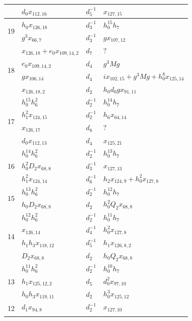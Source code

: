 \documentclass{amsart}
\numberwithin{equation}{section}
\begin{document}
\begin{table}
{\begin{tabular}{|c|l|l|l|}
 & $d_0x_{112,16}$ & $d_{5}^{-1}$ & $x_{127,15}$ \\\hline\hline
\multirow{2}{*}{19} & $h_0x_{126,18}$ & $d_{3}^{-1}$ & $h_0^{15}h_7$ \\\cline{2-4}
 & $g^3x_{66,7}$ & $d_{3}^{-1}$ & $gx_{107,12}$ \\\hline\hline
\multirow{4}{*}{18} & $x_{126,18}+e_0x_{109,14,2}$ & $d_{7}$ & $?$ \\\cline{2-4}
 & $e_0x_{109,14,2}$ & $d_{4}$ & $g^3Mg$ \\\cline{2-4}
 & $gx_{106,14}$ & $d_{4}$ & $ix_{102,15}+g^3Mg+h_0^8x_{125,14}$ \\\cline{2-4}
 & $x_{126,18,2}$ & $d_{2}$ & $h_0d_0gx_{91,11}$ \\\hline\hline
\multirow{4}{*}{17} & $h_0^{15}h_6^2$ & $d_{2}^{-1}$ & $h_0^{14}h_7$ \\\cline{2-4}
 & $h_1^2x_{124,15}$ & $d_{2}^{-1}$ & $h_6x_{64,14}$ \\\cline{2-4}
 & $x_{126,17}$ & $d_{8}$ & $?$ \\\cline{2-4}
 & $d_0x_{112,13}$ & $d_{4}$ & $x_{125,21}$ \\\hline\hline
\multirow{3}{*}{16} & $h_0^{14}h_6^2$ & $d_{2}^{-1}$ & $h_0^{13}h_7$ \\\cline{2-4}
 & $h_0^2D_2x_{68,8}$ & $d_{3}^{-1}$ & $x_{127,13}$ \\\cline{2-4}
 & $h_1^2x_{124,14}$ & $d_{6}^{-1}$ & $h_2x_{124,9}+h_0^2x_{127,8}$ \\\hline\hline
\multirow{2}{*}{15} & $h_0^{13}h_6^2$ & $d_{2}^{-1}$ & $h_0^{12}h_7$ \\\cline{2-4}
 & $h_0D_2x_{68,8}$ & $d_{2}$ & $h_0^2Q_2x_{68,8}$ \\\hline\hline
\multirow{4}{*}{14} & $h_0^{12}h_6^2$ & $d_{2}^{-1}$ & $h_0^{11}h_7$ \\\cline{2-4}
 & $x_{126,14}$ & $d_{4}^{-1}$ & $h_0^2x_{127,8}$ \\\cline{2-4}
 & $h_1h_3x_{118,12}$ & $d_{5}^{-1}$ & $h_1x_{126,8,2}$ \\\cline{2-4}
 & $D_2x_{68,8}$ & $d_{2}$ & $h_0Q_2x_{68,8}$ \\\hline\hline
\multirow{3}{*}{13} & $h_0^{11}h_6^2$ & $d_{2}^{-1}$ & $h_0^{10}h_7$ \\\cline{2-4}
 & $h_1x_{125,12,2}$ & $d_{5}$ & $d_0^2x_{97,10}$ \\\cline{2-4}
 & $h_0h_3x_{119,11}$ & $d_{2}$ & $h_0^3x_{125,12}$ \\\hline\hline
\multirow{5}{*}{12} & $d_1x_{94,8}$ & $d_{2}^{-1}$ & $x_{127,10}$ \\\cline{2-4}

\end{tabular}}
\end{table}
\end{document}
